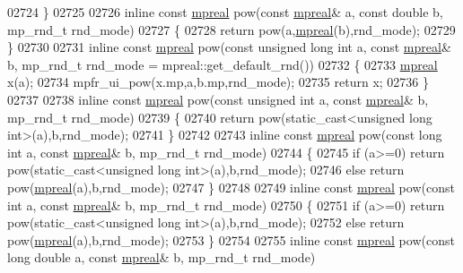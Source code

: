 \begin{DoxyCode}
{{02724 \}
02725 
02726 \textcolor{keyword}{inline} \textcolor{keyword}{const} \hyperlink{classmpfr_1_1mpreal}{mpreal} pow(\textcolor{keyword}{const} \hyperlink{classmpfr_1_1mpreal}{mpreal}& a, \textcolor{keyword}{const} \textcolor{keywordtype}{double} b, mp\_rnd\_t rnd\_mode)
02727 \{
02728     \textcolor{keywordflow}{return} pow(a,\hyperlink{classmpfr_1_1mpreal}{mpreal}(b),rnd\_mode);
02729 \}
02730 
02731 \textcolor{keyword}{inline} \textcolor{keyword}{const} \hyperlink{classmpfr_1_1mpreal}{mpreal} pow(\textcolor{keyword}{const} \textcolor{keywordtype}{unsigned} \textcolor{keywordtype}{long} \textcolor{keywordtype}{int} a, \textcolor{keyword}{const} \hyperlink{classmpfr_1_1mpreal}{mpreal}& b, mp\_rnd\_t rnd\_mode = 
      mpreal::get\_default\_rnd())
02732 \{
02733     \hyperlink{classmpfr_1_1mpreal}{mpreal} x(a);
02734     mpfr\_ui\_pow(x.mp,a,b.mp,rnd\_mode);
02735     \textcolor{keywordflow}{return} x;
02736 \}
02737 
02738 \textcolor{keyword}{inline} \textcolor{keyword}{const} \hyperlink{classmpfr_1_1mpreal}{mpreal} pow(\textcolor{keyword}{const} \textcolor{keywordtype}{unsigned} \textcolor{keywordtype}{int} a, \textcolor{keyword}{const} \hyperlink{classmpfr_1_1mpreal}{mpreal}& b, mp\_rnd\_t rnd\_mode)
02739 \{
02740     \textcolor{keywordflow}{return} pow(static\_cast<unsigned long int>(a),b,rnd\_mode);
02741 \}
02742 
02743 \textcolor{keyword}{inline} \textcolor{keyword}{const} \hyperlink{classmpfr_1_1mpreal}{mpreal} pow(\textcolor{keyword}{const} \textcolor{keywordtype}{long} \textcolor{keywordtype}{int} a, \textcolor{keyword}{const} \hyperlink{classmpfr_1_1mpreal}{mpreal}& b, mp\_rnd\_t rnd\_mode)
02744 \{
02745     \textcolor{keywordflow}{if} (a>=0)     \textcolor{keywordflow}{return} pow(static\_cast<unsigned long int>(a),b,rnd\_mode);
02746     \textcolor{keywordflow}{else}          \textcolor{keywordflow}{return} pow(\hyperlink{classmpfr_1_1mpreal}{mpreal}(a),b,rnd\_mode);
02747 \}
02748 
02749 \textcolor{keyword}{inline} \textcolor{keyword}{const} \hyperlink{classmpfr_1_1mpreal}{mpreal} pow(\textcolor{keyword}{const} \textcolor{keywordtype}{int} a, \textcolor{keyword}{const} \hyperlink{classmpfr_1_1mpreal}{mpreal}& b, mp\_rnd\_t rnd\_mode)
02750 \{
02751     \textcolor{keywordflow}{if} (a>=0)     \textcolor{keywordflow}{return} pow(static\_cast<unsigned long int>(a),b,rnd\_mode);
02752     \textcolor{keywordflow}{else}          \textcolor{keywordflow}{return} pow(\hyperlink{classmpfr_1_1mpreal}{mpreal}(a),b,rnd\_mode);
02753 \}
02754 
02755 \textcolor{keyword}{inline} \textcolor{keyword}{const} \hyperlink{classmpfr_1_1mpreal}{mpreal} pow(\textcolor{keyword}{const} \textcolor{keywordtype}{long} \textcolor{keywordtype}{double} a, \textcolor{keyword}{const} \hyperlink{classmpfr_1_1mpreal}{mpreal}& b, mp\_rnd\_t rnd\_mode)
}}
\end{DoxyCode}
